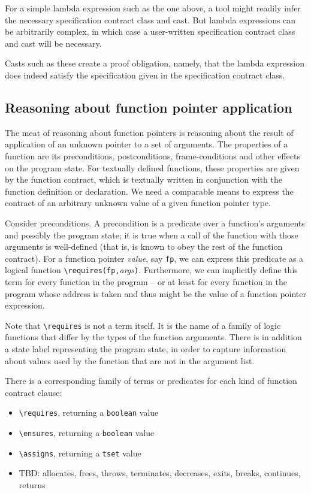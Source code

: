 For a simple lambda expression such as the one above, a tool might readily infer the necessary specification contract class and cast. But lambda expressions can be arbitrarily complex, in which case a user-written specification contract class and cast will be necessary.

Casts such as these create a proof obligation, namely, that the 
lambda expression does indeed satisfy the specification given in the
specification contract class.

\subsection{Reasoning about function pointer application}
\label{sec:fpreasoning}
The meat of reasoning about function pointers is reasoning about the result of application of an unknown pointer to a set of arguments. 
The properties of a function are its
preconditions, postconditions, frame-conditions and other effects on the program state. 
For textually defined functions, these properties are given by 
the function contract, which is textually written in
conjunction with the function definition or declaration.
We need a comparable means to express the contract of an
arbitrary unknown value of a given function pointer type.

Consider preconditions. 
A precondition is a predicate over a
function's arguments and possibly the program state; it is 
true when a call of the function with those arguments is 
well-defined (that is, is known to obey the rest of the function contract). 
For a function pointer \emph{value}, say \lstinline|fp|, we can express this predicate as a logical function
\lstinline|\requires(fp,|\emph{args}\lstinline|)|. 
Furthermore, we can implicitly define this term for every function in the program -- or at least for every function in the program whose address is taken and thus might be the value of a function pointer expression.

Note that \lstinline|\requires| is not a term itself. It is the name of a family of logic functions that differ by the types of the function arguments. There is in addition a state label representing the program state, in order to capture
information about values used by the function that are not in
the argument list. 

There is a corresponding family of terms or predicates for each kind of function contract clause:
\begin{itemize}[noitemsep,nolistsep]
	\item \lstinline|\requires|, returning a \lstinline|boolean| value
	\item \lstinline|\ensures|, returning a \lstinline|boolean| value
	\item\lstinline|\assigns|, returning a \lstinline|tset| value
	\item TBD: allocates, frees, throws, terminates, decreases, exits, breaks, continues, returns
\end{itemize}

